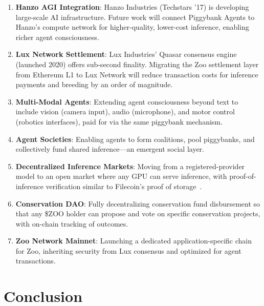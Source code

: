 \documentclass[11pt,letterpaper]{article}
\begin{document}
\begin{enumerate}
    \item \textbf{Hanzo AGI Integration}: Hanzo Industries (Techstars '17) is developing large-scale AI infrastructure. Future work will connect Piggybank Agents to Hanzo's compute network for higher-quality, lower-cost inference, enabling richer agent consciousness.

    \item \textbf{Lux Network Settlement}: Lux Industries' Quasar consensus engine (launched 2020) offers sub-second finality. Migrating the Zoo settlement layer from Ethereum L1 to Lux Network will reduce transaction costs for inference payments and breeding by an order of magnitude.

    \item \textbf{Multi-Modal Agents}: Extending agent consciousness beyond text to include vision (camera input), audio (microphone), and motor control (robotics interfaces), paid for via the same piggybank mechanism.

    \item \textbf{Agent Societies}: Enabling agents to form coalitions, pool piggybanks, and collectively fund shared inference---an emergent social layer.

    \item \textbf{Decentralized Inference Markets}: Moving from a registered-provider model to an open market where any GPU can serve inference, with proof-of-inference verification similar to Filecoin's proof of storage~\cite{filecoin}.

    \item \textbf{Conservation DAO}: Fully decentralizing conservation fund disbursement so that any \$ZOO holder can propose and vote on specific conservation projects, with on-chain tracking of outcomes.

    \item \textbf{Zoo Network Mainnet}: Launching a dedicated application-specific chain for Zoo, inheriting security from Lux consensus and optimized for agent transactions.
\end{enumerate}

\section{Conclusion}
\label{sec:conclusion}
\end{document}
